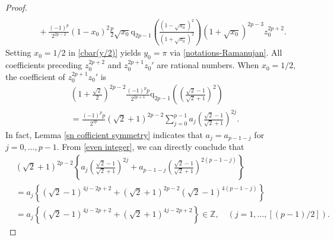 \documentclass[11pt]{article}
\theoremstyle{plain}
\theoremstyle{definition}
\begin{document}
\begin{proof}
\begin{align}
			\nonumber\\
		&\quad
		+\frac{\left( -1 \right) ^p}{2^{2p-2}}(1-x_0)^2\frac{p}{2}\sqrt{x_0}\mathrm{q}_{2p-1}\left( \frac{\left( 1-\sqrt{x_0} \right) ^2}{\left( 1+\sqrt{x_0} \right) ^2} \right) \left( 1+\sqrt{x_0} \right) ^{2p-3}z_{0}^{2p+2}.
		\label{cbar(y/2)}
	\end{align}
Setting $x_0=1/2$ in \eqref{cbar(y/2)}  yields  $y_0=\pi$ via \eqref{notations-Ramanujan}. All coefficients preceding $z_{0}^{2p+2}$ and $z_{0}^{2p+1}z_0'$ are  rational numbers.  When $x_0=1/2$, the coefficient of $z_{0}^{2p+1}z_0'$ is
	\begin{align}
		\left( 1+\frac{\sqrt{2}}{2} \right) ^{2p-2}\frac{\left( -1 \right) ^pp}{2^{2p+1}}\mathrm{q}_{2p-1}\left( \left( \frac{\sqrt{2}-1}{\sqrt{2}+1} \right) ^2 \right) 	\nonumber\\=\frac{\left( -1 \right) ^pp}{2^{3p}}\left( \sqrt{2}+1 \right) ^{2p-2}\sum_{j=0}^{p-1}{a_j\left( \frac{\sqrt{2}-1}{\sqrt{2}+1} \right) ^{2j}}.
	\end{align}
In fact, Lemma \ref{sn cofficient symmetry} indicates  that $a_j=a_{p-1-j}$ for $ j=0,\ldots,p-1$. From \eqref{even integer}, we can directly conclude that
\begin{align}
		&\left( \sqrt{2}+1 \right) ^{2p-2}\left\{ a_j\left( \frac{\sqrt{2}-1}{\sqrt{2}+1} \right) ^{2j}+a_{p-1-j}\left( \frac{\sqrt{2}-1}{\sqrt{2}+1} \right) ^{2\left( p-1-j \right)} \right\}
		\nonumber\\
		&
		=a_j\left\{ \left( \sqrt{2}-1 \right) ^{4j-2p+2}+\left( \sqrt{2}+1 \right) ^{2p-2}\left( \sqrt{2}-1 \right) ^{4\left( p-1-j \right)} \right\}
		\nonumber\\
		&
		=a_j\left\{ \left( \sqrt{2}-1 \right) ^{4j-2p+2}+\left( \sqrt{2}+1 \right) ^{4j-2p+2} \right\} \in \mathbb{Z}, \quad (j=1,\ldots,[(p-1)/2]).
			\end{align}

\end{proof}
\end{document}
